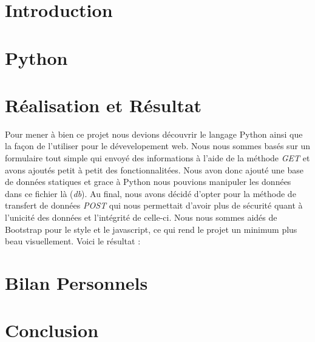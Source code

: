 \documentclass[12pt]{article}
\begin{document}
\tableofcontents
{}
\pagebreak


\section{Introduction}
\section{Python}
\section{Réalisation et Résultat}
Pour mener à bien ce projet nous devions découvrir le langage Python ainsi que la façon de l'utiliser pour le dévevelopement web. Nous nous sommes basés sur un formulaire tout simple qui envoyé des informations à l'aide de la méthode \textit{GET} et avons ajoutés petit à petit des fonctionnalitées. Nous avon donc ajouté une base de données statiques et grace à Python nous pouvions manipuler les données dans ce fichier là (\textit{db}). Au final, nous avons décidé d'opter pour la méthode de transfert de données \textit{POST} qui nous permettait d'avoir plus de sécurité quant à l'unicité des données et l'intégrité de celle-ci. Nous nous sommes aidés de Bootstrap pour le style et le javascript, ce qui rend le projet un minimum plus beau visuellement. \br
Voici le résultat :

\section{Bilan Personnels}
\section{Conclusion}
\end{document}
